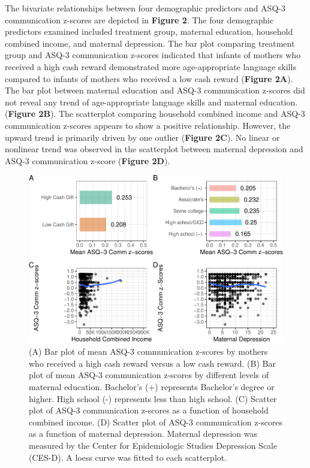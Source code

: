 \documentclass[sn-basic,pdflatex]{sn-jnl}
\begin{document}
The bivariate relationships between four demographic predictors and
ASQ-3 communication z-scores are depicted in \textbf{Figure 2}. The four
demographic predictors examined included treatment group, maternal
education, household combined income, and maternal depression. The bar
plot comparing treatment group and ASQ-3 communication z-scores
indicated that infants of mothers who received a high cash reward
demonstrated more age-appropriate language skills compared to infants of
mothers who received a low cash reward (\textbf{Figure 2A}). The bar
plot between maternal education and ASQ-3 communication z-scores did not
reveal any trend of age-appropriate language skills and maternal
education. (\textbf{Figure 2B}). The scatterplot comparing household
combined income and ASQ-3 communication z-scores appears to show a
positive relationship. However, the upward trend is primarily driven by
one outlier (\textbf{Figure 2C}). No linear or nonlinear trend was
observed in the scatterplot between maternal depression and ASQ-3
communication z-score (\textbf{Figure 2D}).

\begin{figure}

{\centering \includegraphics{HWC_final-paper-draft_files/figure-latex/fig_bivariate-1} 

}

\caption{(A) Bar plot of mean ASQ-3 communication z-scores by mothers who received a high cash reward versus a low cash reward. (B) Bar plot of mean ASQ-3 communication z-scores by different levels of maternal education. Bachelor's (+) represents Bachelor's degree or higher. High school (-) represents less than high school. (C) Scatter plot of ASQ-3 communication z-scores as a function of household combined income. (D) Scatter plot of ASQ-3 communication z-scores as a function of maternal depression. Maternal depression was measured by the Center for Epidemiologic Studies Depression Scale (CES-D). A loess curve was fitted to each scatterplot.}\label{fig:fig_bivariate}
\end{figure}
\end{document}
